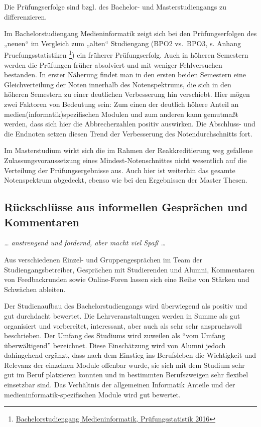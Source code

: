 Die Prüfungserfolge sind bzgl. des Bachelor- und Masterstudiengangs zu
differenzieren.

Im Bachelorstudiengang Medieninformatik zeigt sich bei den
Prüfungserfolgen des „neuen`` im Vergleich zum „alten`` Studiengang
(BPO2 vs.~BPO3, s. Anhang Pruefungsstatistiken \footnote{\href{https://th-koeln.github.io/mi-2017/anhaenge/ba-pruefungsstatistiken.pdf}{Bachelorstudiengang
  Medieninformatik, Prüfungsstatistik 2016}}) ein früherer
Prüfungserfolg. Auch in höheren Semestern werden die Prüfungen früher
absolviert und mit weniger Fehlversuchen bestanden. In erster Näherung
findet man in den ersten beiden Semestern eine Gleichverteilung der
Noten innerhalb des Notenspektrums, die sich in den höheren Semestern zu
einer deutlichen Verbesserung hin verschiebt. Hier mögen zwei Faktoren
von Bedeutung sein: Zum einen der deutlich höhere Anteil an
medien(informatik)spezifischen Modulen und zum anderen kann gemutmaßt
werden, dass sich hier die Abbrecherzahlen positiv auswirken. Die
Abschluss- und die Endnoten setzen diesen Trend der Verbesserung des
Notendurchschnitts fort.

Im Masterstudium wirkt sich die im Rahmen der Reakkreditierung weg
gefallene Zulassungsvoraussetzung eines Mindest-Notenschnittes nicht
wesentlich auf die Verteilung der Prüfungsergebnisse aus. Auch hier ist
weiterhin das gesamte Notenspektrum abgedeckt, ebenso wie bei den
Ergebnissen der Master Thesen.

\subsection{Rückschlüsse aus informellen Gesprächen und
Kommentaren}\label{ruxfcckschluxfcsse-aus-informellen-gespruxe4chen-und-kommentaren}

\emph{\ldots{} anstrengend und fordernd, aber macht viel Spaß \ldots{}}

Aus verschiedenen Einzel- und Gruppengesprächen im Team der
Studiengangsbetreiber, Gesprächen mit Studierenden und Alumni,
Kommentaren von Feedbackrunden sowie Online-Foren lassen sich eine Reihe
von Stärken und Schwächen ableiten.

Der Studienaufbau des Bachelorstudiengangs wird überwiegend als positiv
und gut durchdacht bewertet. Die Lehrveranstaltungen werden in Summe als
gut organisiert und vorbereitet, interessant, aber auch als sehr sehr
anspruchsvoll beschrieben. Der Umfang des Studiums wird zuweilen als
``vom Umfang überwältigend'' bezeichnet. Diese Einschätzung wird von
Alumni jedoch dahingehend ergänzt, dass nach dem Einstieg ins
Berufsleben die Wichtigkeit und Relevanz der einzelnen Module offenbar
wurde, sie sich mit dem Studium sehr gut im Beruf platzieren konnten und
in bestimmten Berufszweigen sehr flexibel einsetzbar sind. Das
Verhältnis der allgemeinen Informatik Anteile und der
medieninformatik-spezifischen Module wird gut bewertet.


